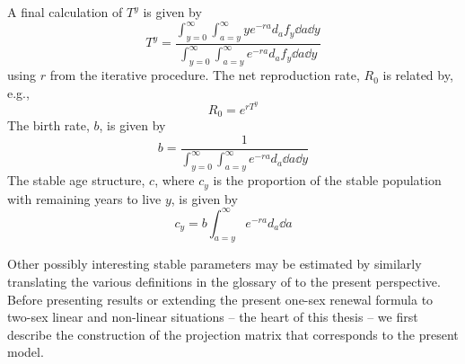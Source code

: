  \FloatBarrier
 \label{sec:ex1sexother}
A final calculation of $T^y$ is given by
\begin{equation}
\label{eq:Ty}
 T^y =  \frac{\int _{y=0}^\infty \int _{a=y}^\infty y e^{-ra} d_a f_y \dd a
\dd y}{\int _{y=0}^\infty \int _{a=y}^\infty e^{-ra} d_a f_y \dd a \dd y}
\end{equation}
using $r$ from the iterative procedure. The net reproduction rate, $R_0$ is
related by, e.g.,
\begin{equation}
\label{eq:R0fromTy}
R_0 = e^{r T^y}
\end{equation}
The birth rate, $b$, is given by
\begin{equation}
\label{eq:eybrate}
b = \frac{1}{\int _{y=0}^\infty \int _{a=y}^\infty e^{-ra} d_a \dd a
\dd y}
\end{equation}
The stable age structure, $c$, where $c_y$ is the
proportion of the stable population with remaining years to live $y$, is given
by
\begin{equation}
\label{eq:cy}
c_y = b \int _{a=y}^\infty e^{-ra} d_a \dd a
\end{equation}

Other possibly interesting stable parameters may be estimated by
similarly translating the various definitions in the glossary of
\citet{coale1972growth} to the present perspective. Before presenting 
results or extending the present one-sex renewal
formula to two-sex linear and non-linear situations -- the heart of this 
thesis -- we first describe the construction of the projection matrix that
corresponds to the present model.